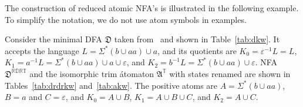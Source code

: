 \documentclass{llncs}
\newcommand{\eps}{\varepsilon}
\newcommand{\Sig}{\Sigma}
\newcommand{\fA}{{\mathfrak A}}
\newcommand{\fD}{{\mathfrak D}}
\newcommand{\rev}{\mathbb{R}}
\newcommand{\deter}{\mathbb{D}}
\newcommand{\trim}{\mathbb{T}}
\begin{document}
The construction of reduced atomic NFA's is illustrated in the following example.
To simplify the notation, we do not use atom symbols in examples.

\begin{example}
\label{ex:reducedatomic}
Consider the minimal DFA $\fD$ taken from~\cite{KaWe70} and  shown in 
Table~\ref{tab:dkw}.
It accepts the language $L=\Sig^*(b\cup aa) \cup a$, and its quotients are
$K_0=\eps^{-1}L=L$, 
$K_1=a^{-1}L=\Sig^*(b\cup aa) \cup a \cup \eps$, and
$K_2=b^{-1}L=\Sig^*(b\cup aa) \cup \eps$.
NFA $\fD^{\rev\deter\rev\trim}$ and the isomorphic trim \'atomaton $\fA^\trim$ with states renamed  are shown in Tables~\ref{tab:drdrkw} and~\ref{tab:akw}.
The positive atoms are
$A=\Sig^*(b\cup aa)$, $B=a$ and $C=\eps$, and
$K_0=A\cup B$, 
$K_1=A\cup B\cup C$,
and $K_2=A \cup C$.



\end{example}
\end{document}
